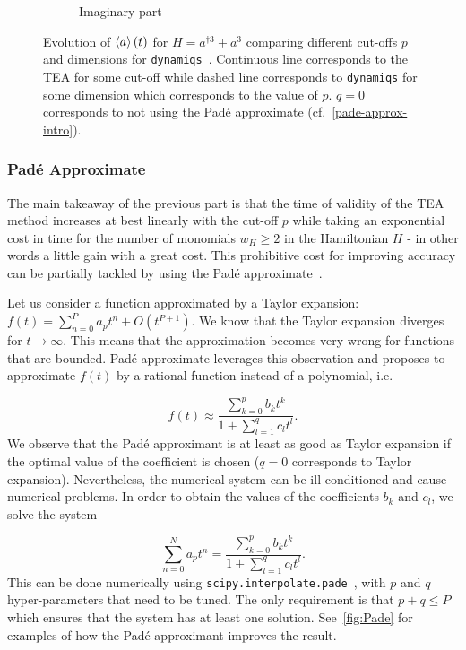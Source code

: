 \begin{figure}[h!]
\begin{subfigure}{0.49\linewidth}
        \caption{Imaginary part}
        \label{fig:Im_H_pathos}
    \end{subfigure}
    \caption{Evolution of $\left\langle a \right\rangle(t)$ for $H = a^{\dagger 3} + a^3$ comparing different cut-offs $p$ and dimensions for \texttt{dynamiqs}~\cite{dynamiqs}.  Continuous line corresponds to the TEA for some cut-off while dashed line corresponds to \texttt{dynamiqs} for some dimension which corresponds to the value of $p$. $q = 0$ corresponds to not using the Padé approximate (cf.\@~\autoref{pade-approx-intro}).}
    \label{fig:H_pathos}
\end{figure}

\subsubsection{Padé Approximate} \label{pade-approx-intro}

The main takeaway of the previous part is that the time of validity of the TEA method increases at best linearly with the cut-off $p$ while taking an exponential cost in time for the number of monomials $w_H \ge 2$ in the Hamiltonian $H$ - in other words a little gain with a great cost. This prohibitive cost for improving accuracy can be partially tackled by using the Padé approximate~\cite{pade_mems, wiki-pade}.

Let us consider a function approximated by a Taylor expansion: $f(t) = \sum_{n=0}^P a_p t^n + O(t^{P+1})$. We know that the Taylor expansion diverges for $t \rightarrow \infty$. This means that the approximation becomes very wrong for functions that are bounded. Padé approximate leverages this observation and proposes to approximate $f(t)$ by a rational function instead of a polynomial, i.e.\@

\begin{equation}
    f(t) \approx \frac{\sum_{k=0}^p b_k t^k}{1 + \sum_{l=1}^q c_l t^l}.
\end{equation}
We observe that the Padé approximant is at least as good as Taylor expansion if the optimal value of the coefficient is chosen ($q = 0$ corresponds to Taylor expansion). Nevertheless, the numerical system can be ill-conditioned and cause numerical problems. In order to obtain the values of the coefficients $b_k$ and $c_l$, we solve the system

\begin{equation}
    \sum_{n=0}^N a_p t^n = \frac{\sum_{k=0}^p b_k t^k}{1 + \sum_{l=1}^q c_l t^l}.
\end{equation}
This can be done numerically using \texttt{scipy.interpolate.pade}~\cite{scipy}, with $p$ and $q$ hyper-parameters that need to be tuned. The only requirement is that $p+q \le P$ which ensures that the system has at least one solution. See~\autoref{fig:Pade} for examples of how the Padé approximant improves the result.

